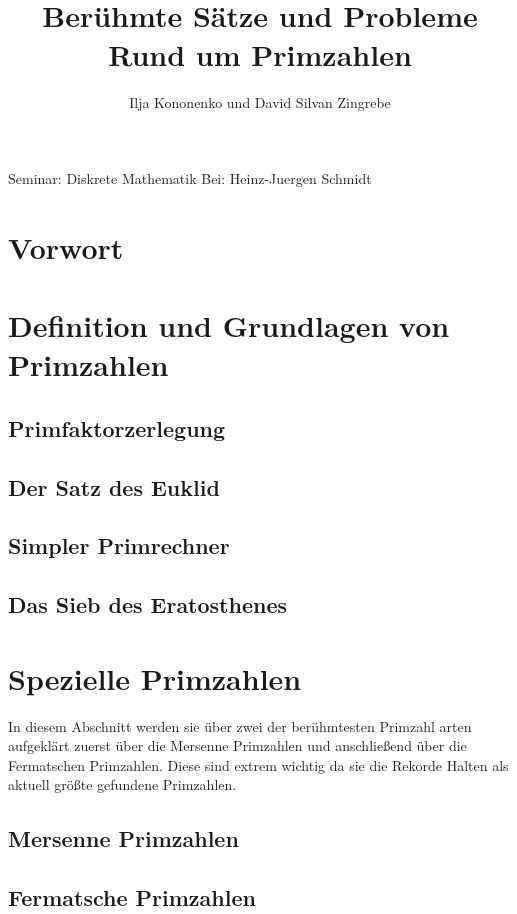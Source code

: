 \documentclass[11pt]{article}
\begin{document}
\begin{titlepage}
\title{Berühmte Sätze und Probleme Rund um Primzahlen}
\author{Ilja Kononenko und David Silvan Zingrebe}
\maketitle
Seminar: Diskrete Mathematik
Bei: Heinz-Juergen Schmidt
\end{titlepage}
\tableofcontents
\newpage
\section*{Vorwort}

\newpage
\section{Definition und Grundlagen von Primzahlen}

\subsection{Primfaktorzerlegung}

\newpage
\subsection{Der Satz des Euklid}
\newpage
\subsection{Simpler Primrechner}

\newpage
\subsection{Das Sieb des Eratosthenes}

\newpage
\section{Spezielle Primzahlen}
In diesem Abschnitt werden sie über zwei der berühmtesten Primzahl arten aufgeklärt zuerst über die Mersenne Primzahlen und anschließend über die Fermatschen Primzahlen. Diese sind extrem wichtig da sie die Rekorde Halten als aktuell größte gefundene Primzahlen.
\subsection{Mersenne Primzahlen}

\newpage
\subsection{Fermatsche Primzahlen}
\newpage
\end{document}
